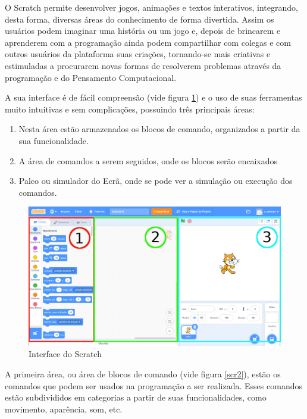 \documentclass[12pt, openright, a4paper, brazil, english, french, spanish, bibjustif, openany, oneside]{abntex2}
\begin{document}
O Scratch permite desenvolver jogos, animações e textos interativos, integrando, desta forma, diversas áreas do conhecimento de forma divertida. Assim os usuários podem imaginar uma história ou um jogo e, depois de brincarem e aprenderem com a programação ainda podem compartilhar com colegas e com outros usuários da plataforma suas criações, tornando-se mais criativas e estimuladas a procurarem novas formas de resolverem problemas através da programação e do Pensamento Computacional. 

 
A sua interface é de fácil compreensão (vide figura \ref{scr1}) e o uso de suas ferramentas muito intuitivas e sem complicações, possuindo três principais áreas:
 
\begin{enumerate}
\item Nesta área estão armazenados os blocos de comando, organizados a partir da sua funcionalidade.
\item A área de comandos a serem seguidos, onde os blocos serão encaixados
\item Palco ou simulador do Ecrã, onde se pode ver a simulação ou execução dos comandos.
\end{enumerate}

\begin{figure}[h]

    \center
    \caption{Interface do Scratch \label{scr1}}
    \includegraphics[width=13cm]{scratch1.png}
    
\end{figure}


A primeira área, ou área de blocos de comando (vide figura \ref{scr2}), estão os comandos que podem ser usados na programação a ser realizada. Esses comandos estão subdivididos em categorias a partir de suas funcionalidades, como movimento, aparência, som, etc.
\end{document}
